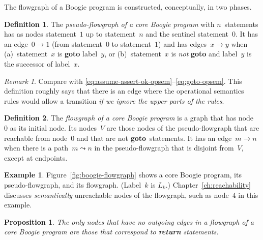 \documentclass[a4paper]{article}
\theoremstyle{slanted}
\newtheorem{proposition}{Proposition}
\theoremstyle{definition}
\newtheorem{definition}{Definition}
\newtheorem{example}{Example}
\theoremstyle{remark}
\newtheorem{remark}{Remark}
\begin{document}
The flowgraph of a Boogie program is constructed, conceptually,
in two phases.

\begin{definition}
The \emph{pseudo-flowgraph of a core Boogie program} with
$n$~statements has as nodes statement~$1$ up to statement~$n$
and the sentinel statement~$0$. It has an edge~$0\to1$
(from statement~$0$ to statement~$1$) and has edges~$x\to
y$ when (a)~statement~$x$ is \textbf{goto} label~$y$, or
(b)~statement~$x$ is \emph{not} \textbf{goto} and label~$y$ is
the successor of label~$x$.
\end{definition}

\begin{remark}
Compare with
\eqref{eq:assume-assert-ok-opsem}--\eqref{eq:goto-opsem}.
This definition roughly says that there is an edge where the
operational semantics rules would allow a transition \emph{if we
ignore the upper parts of the rules}.
\end{remark}

\begin{definition}
The \emph{flowgraph of a core Boogie program} is a graph that has
node~$0$ as its initial node. Its nodes~$V$ are those nodes of
the pseudo-flowgraph that are reachable from node~$0$ and that
are not \textbf{goto}~statements. It has an edge~$m\to n$ when
there is a path~$m\leadsto n$ in the pseudo-flowgraph that is
disjoint from~$V$, except at endpoints.
\label{def:boogie-flowgraph}
\end{definition}

\begin{example}
Figure~\ref{fig:boogie-flowgraph} shows a core Boogie program,
its pseudo-flowgraph, and its flowgraph. (Label~$k$ is $L_k$.)
Chapter~\ref{ch:reachability} discusses \emph{semantically}
unreachable nodes of the flowgraph, such as node~$4$ in this
example.
\end{example}

\begin{proposition}
The only nodes that have no outgoing edges in a flowgraph of a
core Boogie program are those that correspond to \textbf{return}
statements.
\end{proposition}
\end{document}
